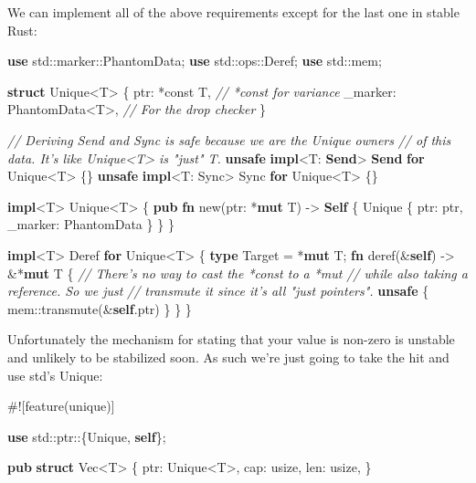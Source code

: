 \documentclass[a4paper,]{book}
\newenvironment{Shaded}{\begin{snugshade}}{\end{snugshade}}
\newcommand{\KeywordTok}[1]{\textcolor[rgb]{0.13,0.29,0.53}{\textbf{{#1}}}}
\newcommand{\CommentTok}[1]{\textcolor[rgb]{0.56,0.35,0.01}{\textit{{#1}}}}
\newcommand{\NormalTok}[1]{{#1}}
\begin{document}
We can implement all of the above requirements except for the last one
in stable Rust:

\begin{Shaded}
\begin{Highlighting}[]
\KeywordTok{use} \NormalTok{std::marker::PhantomData;}
\KeywordTok{use} \NormalTok{std::ops::Deref;}
\KeywordTok{use} \NormalTok{std::mem;}

\KeywordTok{struct} \NormalTok{Unique<T> \{}
    \NormalTok{ptr: *const T,              }\CommentTok{// *const for variance}
    \NormalTok{_marker: PhantomData<T>,    }\CommentTok{// For the drop checker}
\NormalTok{\}}

\CommentTok{// Deriving Send and Sync is safe because we are the Unique owners}
\CommentTok{// of this data. It's like Unique<T> is "just" T.}
\KeywordTok{unsafe} \KeywordTok{impl}\NormalTok{<T: }\KeywordTok{Send}\NormalTok{> }\KeywordTok{Send} \KeywordTok{for} \NormalTok{Unique<T> \{\}}
\KeywordTok{unsafe} \KeywordTok{impl}\NormalTok{<T: Sync> Sync }\KeywordTok{for} \NormalTok{Unique<T> \{\}}

\KeywordTok{impl}\NormalTok{<T> Unique<T> \{}
    \KeywordTok{pub} \KeywordTok{fn} \NormalTok{new(ptr: *}\KeywordTok{mut} \NormalTok{T) -> }\KeywordTok{Self} \NormalTok{\{}
        \NormalTok{Unique \{ ptr: ptr, _marker: PhantomData \}}
    \NormalTok{\}}
\NormalTok{\}}

\KeywordTok{impl}\NormalTok{<T> Deref }\KeywordTok{for} \NormalTok{Unique<T> \{}
    \KeywordTok{type} \NormalTok{Target = *}\KeywordTok{mut} \NormalTok{T;}
    \KeywordTok{fn} \NormalTok{deref(&}\KeywordTok{self}\NormalTok{) -> &*}\KeywordTok{mut} \NormalTok{T \{}
        \CommentTok{// There's no way to cast the *const to a *mut}
        \CommentTok{// while also taking a reference. So we just}
        \CommentTok{// transmute it since it's all "just pointers".}
        \KeywordTok{unsafe} \NormalTok{\{ mem::transmute(&}\KeywordTok{self}\NormalTok{.ptr) \}}
    \NormalTok{\}}
\NormalTok{\}}
\end{Highlighting}
\end{Shaded}

Unfortunately the mechanism for stating that your value is non-zero is
unstable and unlikely to be stabilized soon. As such we're just going to
take the hit and use std's Unique:

\begin{Shaded}
\begin{Highlighting}[]
\NormalTok{#![feature(unique)]}

\KeywordTok{use} \NormalTok{std::ptr::\{Unique, }\KeywordTok{self}\NormalTok{\};}

\KeywordTok{pub} \KeywordTok{struct} \NormalTok{Vec<T> \{}
    \NormalTok{ptr: Unique<T>,}
    \NormalTok{cap: usize,}
    \NormalTok{len: usize,}
\NormalTok{\}}
\end{Highlighting}
\end{Shaded}
\end{document}
